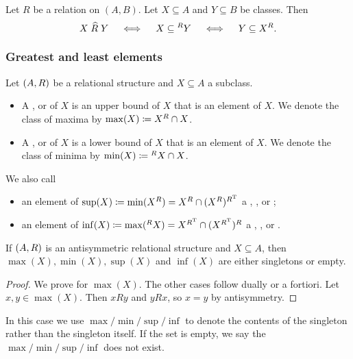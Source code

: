 \begin{lemma} \label{polarsSetRelation}
Let $R$ be a relation on $(A,B)$. Let $X\subseteq A$ and $Y\subseteq B$ be classes. Then
\[ X \mathrel{\widehat{R}} Y \quad\iff\quad X \subseteq {^RY} \quad\iff\quad Y \subseteq X^R. \]
\end{lemma}

\subsubsection{Greatest and least elements}
\begin{definition}
Let $\sSet{A, R}$ be a relational structure and $X\subseteq A$ a subclass.
\begin{itemize}
\item A ,  or  of $X$ is an upper bound of $X$ that is an element of $X$. We denote the class of maxima by $\max(X) \coloneqq X^R\cap X$.
\item A ,  or  of $X$ is a lower bound of $X$ that is an element of $X$. We denote the class of minima by $\min(X) \coloneqq {^RX}\cap X$.
\end{itemize}
We also call
\begin{itemize}
\item an element of $\sup(X) \coloneqq \min(X^R) = X^R \cap (X^R)^{R^{\mathrm{T}}}$ a , , or ;
\item an element of $\inf(X) \coloneqq \max({^RX}) = X^{R^{\mathrm{T}}} \cap (X^{R^{\mathrm{T}}})^R$ a , , or .
\end{itemize}
\end{definition}

\begin{lemma} \label{minMaxSingletons}
If $\sSet{A, R}$ is an antisymmetric relational structure and $X\subseteq A$, then $\max(X), \min(X), \sup(X)$ and $\inf(X)$ are either singletons or empty.
\end{lemma}
\begin{proof}
We prove for $\max(X)$. The other cases follow dually or a fortiori. Let $x,y\in \max(X)$. Then $xRy$ and $yRx$, so $x=y$ by antisymmetry.
\end{proof}
In this case we use $\max/\min/\sup/\inf$ to denote the contents of the singleton rather than the singleton itself. If the set is empty, we say the $\max/\min/\sup/\inf$ does not exist.

